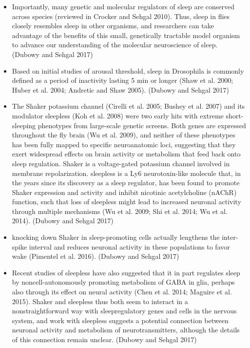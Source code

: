 \documentclass[11pt]{article}
\begin{document}
\begin{itemize}
    \item Importantly, many genetic and molecular regulators of sleep are conserved across species 
    (reviewed in Crocker and Sehgal 2010). Thus, sleep in flies closely resembles sleep in other 
    organisms, and researchers can take advantage of the benefits of this small, genetically 
    tractable model organism to advance our understanding of the molecular neuroscience of sleep.
    \cite{dubowyCircadianRhythmsSleep2017} (Dubowy and Sehgal 2017)

    \item Based on initial studies of arousal threshold, sleep in Drosophila is commonly defined 
    as a period of inactivity lasting 5 min or longer (Shaw et al. 2000; Huber et al. 2004; Andretic 
    and Shaw 2005).
    \cite{dubowyCircadianRhythmsSleep2017} (Dubowy and Sehgal 2017)

    \newpage
    \item The Shaker potassium channel (Cirelli et al. 2005; Bushey et al. 2007) and its modulator 
    sleepless (Koh et al. 2008) were two early hits with extreme short-sleeping phenotypes from 
    large-scale genetic screens. Both genes are expressed throughout the fly brain (Wu et al. 2009),
    and neither of these phenotypes has been fully mapped to specific neuroanatomic loci, suggesting
    that they exert widespread effects on brain activity or metabolism that feed back onto sleep 
    regulation. Shaker is a voltage-gated potassium channel involved in membrane repolarization.
    sleepless is a Ly6 neurotoxin-like molecule that, in the years since its discovery as a 
    sleep regulator, has been found to promote Shaker expression and activity and inhibit 
    nicotinic acetylcholine (nAChR) function, such that loss of sleepless might lead to 
    increased neuronal activity through multiple mechanisms 
    (Wu et al. 2009; Shi et al. 2014; Wu et al. 2014).
    \cite{dubowyCircadianRhythmsSleep2017} (Dubowy and Sehgal 2017)

    \item knocking down Shaker in sleep-promoting cells actually lengthens the inter-spike 
    interval and reduces neuronal activity in these populations to favor wake (Pimentel et al. 2016).
    \cite{dubowyCircadianRhythmsSleep2017} (Dubowy and Sehgal 2017)

    \item Recent studies of sleepless have also suggested that it in part regulates sleep by 
    noncell-autonomously promoting metabolism of GABA in glia, perhaps also through its effect 
    on neural activity (Chen et al. 2014; Maguire et al. 2015).
    Shaker and sleepless thus both seem to interact in a nonstraightforward way with sleepregulatory
    genes and cells in the nervous system, and work with sleepless suggests a potential connection 
    between neuronal activity and metabolism of neurotransmitters, although the details of this 
    connection remain unclear.
    \cite{dubowyCircadianRhythmsSleep2017} (Dubowy and Sehgal 2017)


\end{itemize}
\end{document}
